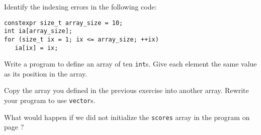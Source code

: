 %
%
\begin{question}
Identify the indexing errors in the following code:
\begin{lstlisting}
constexpr size_t array_size = 10;
int ia[array_size];
for (size_t ix = 1; ix <= array_size; ++ix)
   ia[ix] = ix;
\end{lstlisting}
\end{question}

\begin{question}
Write a program to define an array of ten \verb|int|s. Give each
element the same value as its position in the array.
\end{question}

\begin{question}
Copy the array you defined in the previous exercise into
another array. Rewrite your program to use \verb|vector|s.
\end{question}

\begin{question}
What would happen if we did not initialize the \verb|scores| array
in the program on page \pageref{lst:use an array to hold the cluster counters}?
\end{question}
